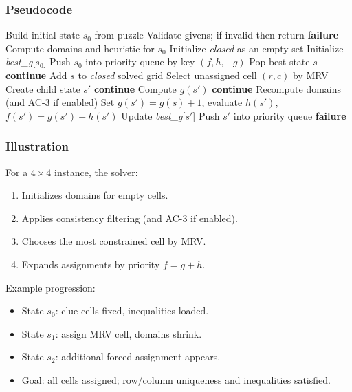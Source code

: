 \subsubsection{Pseudocode}
\begin{algorithm}[H]
\caption{A* for Futoshiki (with MRV and AC-3)}
\begin{algorithmic}[1]
\State Build initial state \(s_0\) from puzzle
\State Validate givens; if invalid then return \textbf{failure}
\State Compute domains and heuristic for \(s_0\)
\State Initialize \textit{closed} as an empty set
\State Initialize \textit{best\_g}[\(s_0\)]
\State Push \(s_0\) into priority queue by key \((f, h, -g)\)
\State Pop best state \(s\)
 \State \textbf{continue} \EndIf
\State Add \(s\) to \textit{closed}
 \Return solved grid \EndIf
\State Select unassigned cell \((r,c)\) by MRV
\State Create child state \(s'\)
 \State \textbf{continue} \EndIf
\State Compute \(g(s')\)
\State \textbf{continue}
\EndIf
\State Recompute domains (and AC-3 if enabled)
\State Set \(g(s') = g(s)+1\), evaluate \(h(s')\), \(f(s')=g(s')+h(s')\)
\State Update \textit{best\_g}[\(s'\)]
\State Push \(s'\) into priority queue
\EndIf
\EndIf
\EndFor
\EndWhile
\State \Return \textbf{failure}
\end{algorithmic}
\end{algorithm}

\subsubsection{Illustration}
For a \(4 \times 4\) instance, the solver:
\begin{enumerate}
\item Initializes domains for empty cells.
\item Applies consistency filtering (and AC-3 if enabled).
\item Chooses the most constrained cell by MRV.
\item Expands assignments by priority \(f=g+h\).
\end{enumerate}

Example progression:
\begin{itemize}
\item State \(s_0\): clue cells fixed, inequalities loaded.
\item State \(s_1\): assign MRV cell, domains shrink.
\item State \(s_2\): additional forced assignment appears.
\item Goal: all cells assigned; row/column uniqueness and inequalities satisfied.
\end{itemize}

